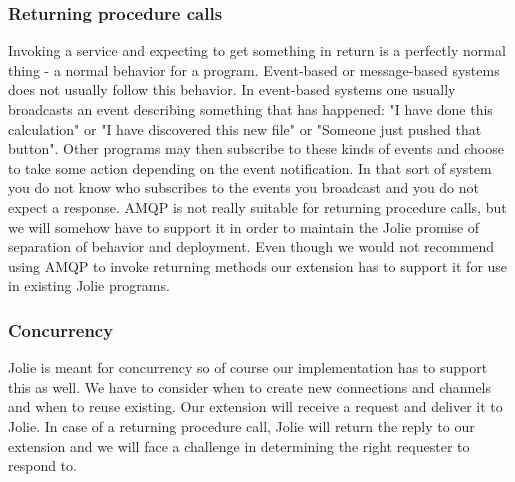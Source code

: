 \subsubsection{Returning procedure calls}
Invoking a service and expecting to get something in return is a perfectly normal thing - a normal behavior for a program. Event-based or message-based systems does not usually follow this behavior. In event-based systems one usually broadcasts an event describing something that has happened: "I have done this calculation" or "I have discovered this new file" or "Someone just pushed that button". Other programs may then subscribe to these kinds of events and choose to take some action depending on the event notification. In that sort of system you do not know who subscribes to the events you broadcast and you do not expect a response. AMQP is not really suitable for returning procedure calls, but we will somehow have to support it in order to maintain the Jolie promise of separation of behavior and deployment. Even though we would not recommend using AMQP to invoke returning methods our extension has to support it for use in existing Jolie programs.
\subsubsection{Concurrency}
Jolie is meant for concurrency so of course our implementation has to support this as well. We have to consider when to create new connections and channels and when to reuse existing. Our extension will receive a request and deliver it to Jolie. In case of a returning procedure call, Jolie will return the reply to our extension and we will face a challenge in determining the right requester to respond to.
\newpage